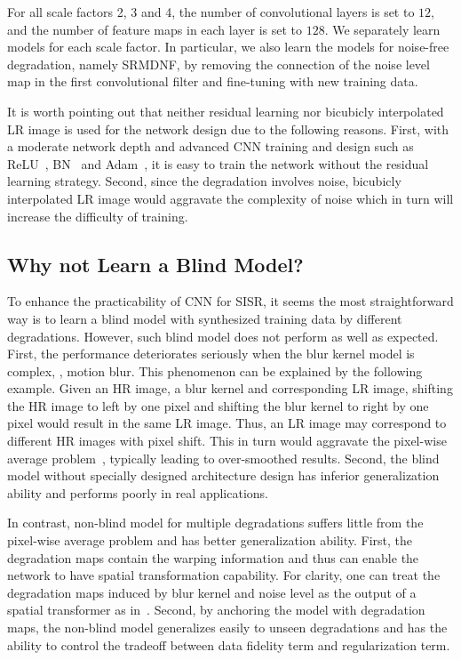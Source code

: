\documentclass[10pt,twocolumn,letterpaper]{article}
\begin{document}
For all scale factors 2, 3 and 4, the number of convolutional layers is set to $12$, and the number of feature maps in each layer is set to $128$.
We separately learn models for each scale factor.
In particular, we also learn the models for noise-free degradation, namely SRMDNF, by removing the connection of the noise level map in the first convolutional filter and fine-tuning with new training data.

It is worth pointing out that neither residual learning nor bicubicly interpolated LR image is used for the network design due to the following reasons.
First, with a moderate network depth and advanced CNN training and design such as ReLU~\cite{krizhevsky2012imagenet}, BN~\cite{ioffe2015batch} and Adam~\cite{kingma2014adam}, it is easy to train the network without the residual learning strategy.
Second, since the degradation involves noise, bicubicly interpolated LR image would aggravate the complexity of noise which in turn will increase the difficulty of training.


\subsection{Why not Learn a Blind Model?}
To enhance the practicability of CNN for SISR, it seems the most straightforward way is to learn a blind model with synthesized
training data by different degradations. However, such blind model does not perform as well as expected. %
First, the performance deteriorates seriously when the blur kernel model is complex, \eg, motion blur.
This phenomenon can be explained by the following example. Given an HR image, a blur kernel and corresponding LR image, shifting the HR image to left by one pixel and shifting the blur kernel to right by one pixel would result in the same LR image. Thus, an LR image may correspond to different HR images with pixel shift. This in turn would aggravate the pixel-wise average problem~\cite{ledig2016photo}, typically leading to over-smoothed results.
Second, the blind model without specially designed architecture design has inferior generalization ability and performs poorly in real applications.


In contrast, non-blind model for multiple degradations suffers little from the pixel-wise average problem and has better generalization ability.
First, the degradation maps contain the warping information and thus can enable the network to have spatial transformation capability.
For clarity, one can treat the degradation maps induced by blur kernel and noise level as the output of a spatial transformer as in~\cite{jaderberg2015spatial}.
Second, by anchoring the model with degradation maps, the non-blind model generalizes easily to unseen degradations and has the ability to control the tradeoff between data fidelity term and regularization term.
\end{document}
